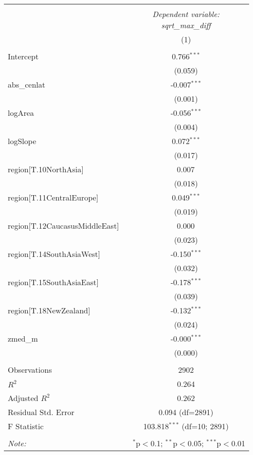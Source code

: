 \begin{table}[!htbp] \centering
\begin{tabular}{@{\extracolsep{5pt}}lc}
\\[-1.8ex]\hline
\hline \\[-1.8ex]
& \multicolumn{1}{c}{\textit{Dependent variable: sqrt_max_diff}} \
\cr \cline{2-2}
\\[-1.8ex] & (1) \\
\hline \\[-1.8ex]
 Intercept & 0.766$^{***}$ \\
& (0.059) \\
 abs_cenlat & -0.007$^{***}$ \\
& (0.001) \\
 logArea & -0.056$^{***}$ \\
& (0.004) \\
 logSlope & 0.072$^{***}$ \\
& (0.017) \\
 region[T.10NorthAsia] & 0.007$^{}$ \\
& (0.018) \\
 region[T.11CentralEurope] & 0.049$^{***}$ \\
& (0.019) \\
 region[T.12CaucasusMiddleEast] & 0.000$^{}$ \\
& (0.023) \\
 region[T.14SouthAsiaWest] & -0.150$^{***}$ \\
& (0.032) \\
 region[T.15SouthAsiaEast] & -0.178$^{***}$ \\
& (0.039) \\
 region[T.18NewZealand] & -0.132$^{***}$ \\
& (0.024) \\
 zmed_m & -0.000$^{***}$ \\
& (0.000) \\
\hline \\[-1.8ex]
 Observations & 2902 \\
 $R^2$ & 0.264 \\
 Adjusted $R^2$ & 0.262 \\
 Residual Std. Error & 0.094 (df=2891) \\
 F Statistic & 103.818$^{***}$ (df=10; 2891) \\
\hline
\hline \\[-1.8ex]
\textit{Note:} & \multicolumn{1}{r}{$^{*}$p$<$0.1; $^{**}$p$<$0.05; $^{***}$p$<$0.01} \\
\end{tabular}
\end{table}